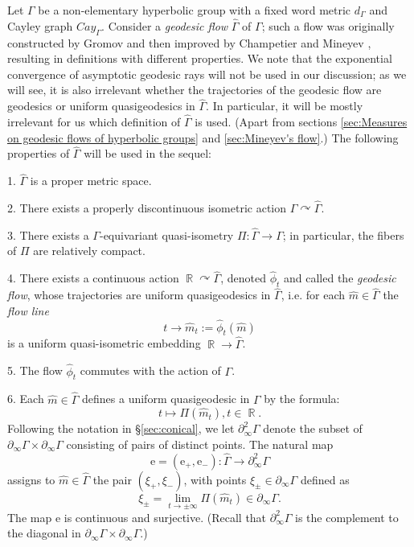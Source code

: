 \documentclass[12pt]{amsbook}%
\theoremstyle{definition}
\theoremstyle{remark}
\numberwithin{section}{chapter}
\numberwithin{subsection}{section}
\numberwithin{figure}{chapter}
\DeclareMathOperator{\acts}{\curvearrowright}
\DeclareMathOperator{\R}{\mathbb{R}}
\def\re{\mathrm{e}}
\def\Ga{\Gamma}
\def\geo{\partial_\infty}
\begin{document}
Let $\Gamma$ be a non-elemen\-tary hyperbolic group with a fixed word metric $d_\Ga$ and Cayley graph $Cay_\Ga$.  Consider a {\em geodesic flow} $\widehat\Ga$ of $\Ga$;  such a  flow was originally constructed by Gromov \cite{Gromov} and then improved by Champetier \cite{Champetier} and Mineyev \cite{Mineyev2005}, resulting in definitions with different properties. We note that the exponential convergence of asymptotic geodesic rays will not be used in our discussion; 
as we will see, it is also irrelevant whether the trajectories of the geodesic flow are geodesics or uniform quasigeodesics in $\widehat\Ga$. 
In particular, it will be mostly irrelevant for us which definition of $\widehat\Ga$ is used. (Apart from sections \ref{sec:Measures on geodesic flows of hyperbolic groups} and  \ref{sec:Mineyev's flow}.) %
The following properties of $\widehat\Ga$ will be used in the sequel:

1. $\widehat\Ga$ is a proper metric space. 

2. There exists a %
properly discontinuous isometric action 
$\Ga\acts\widehat\Ga$. 

3. There exists a $\Ga$-equivariant quasi-isometry $\Pi: \widehat\Ga\to \Ga$; in particular, the fibers of $\Pi$ are relatively compact.

4. There exists a continuous action $\R\acts\widehat\Ga$, denoted $\hat\phi_t$ and called the {\em geodesic flow}, \index{$(\widehat\Ga,\hat\phi_t)$, 
geodesic flow of a hyperbolic group} 
whose trajectories are uniform quasigeodesics in $\widehat\Ga$, i.e. for each $\hat m\in \widehat\Ga$ the 
{\em flow line} 
$$
t\to \hat m_t := \hat\phi_t(\hat m)
$$ 
is a uniform quasi-isometric embedding $\R\to \widehat\Ga$. 

5. The flow $\hat\phi_t$ commutes with the action of $\Ga$. 

6. Each $\hat m\in\hat\Ga$ defines a uniform  
quasigeodesic %
 in $\Ga$ by the formula: 
$$
t\mapsto \Pi(\hat m_t), t\in \R.  
$$
Following the notation in \S \ref{sec:conical}, we let $\geo^2\Ga$ denote the subset of $\geo\Ga\times\geo\Ga$ 
consisting of pairs of distinct points. 
The natural map 
$$
 \re=(\re_+, \re_-): \widehat\Ga\to \geo^2\Ga 
$$
assigns to $\hat m\in  \widehat\Ga$ the pair $(\xi_+, \xi_-)$, with points $\xi_\pm\in \geo \Ga$ defined as 
$$
\xi_\pm=  \lim_{t\to\pm\infty}  \Pi(\hat m_t)\in \geo \Ga. 
$$
The map $\mathrm{e}$ is continuous and surjective. (Recall that $ \geo^2\Ga$ is the complement to the diagonal in $\geo \Ga\times \geo \Ga$.) 
\end{document}

